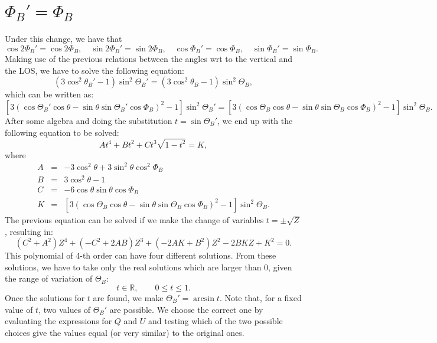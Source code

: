 \documentclass[12pt]{article}
\begin{document}
\section{$\Phi_B' = \Phi_B$}
Under this change, we have that
\begin{equation}
\cos 2\Phi_B' = \cos 2\Phi_B, \quad \sin 2\Phi_B' = \sin 2\Phi_B, \quad \cos \Phi_B' = \cos \Phi_B, \quad \sin \Phi_B' = \sin \Phi_B.
\end{equation}
Making use of the previous relations between the angles wrt to the vertical and the LOS, we have to solve the 
following equation:
\begin{equation}
\left( 3 \cos^2\theta_B'-1 \right) \sin^2 \Theta_B' = \left( 3 \cos^2\theta_B-1 \right) \sin^2 \Theta_B,
\end{equation}
which can be written as:
\begin{equation}
\left[ 3 \left( \cos \Theta_B' \cos \theta - \sin\theta \sin\Theta_B' \cos\Phi_B\right)^2-1 \right] \sin^2 \Theta_B' = 
\left[ 3 \left( \cos \Theta_B \cos \theta - \sin\theta \sin\Theta_B \cos\Phi_B\right)^2-1 \right] \sin^2 \Theta_B.
\end{equation}
After some algebra and doing the substitution $t=\sin\Theta_B'$, we end up with the following equation to be
solved:
\begin{equation}
A t^4 + Bt^2 + C t^3 \sqrt{1-t^2} = K,
\end{equation}
where
\begin{eqnarray}
A &=& -3\cos^2 \theta + 3\sin^2 \theta \cos^2 \Phi_B \nonumber \\
B &=& 3\cos^2 \theta - 1 \nonumber \\
C &=& -6 \cos\theta \sin\theta \cos \Phi_B \nonumber \\
K &=& \left[ 3 \left( \cos \Theta_B \cos \theta - \sin\theta \sin\Theta_B \cos\Phi_B\right)^2-1 \right] \sin^2 \Theta_B.
\end{eqnarray}
The previous equation can be solved if we make the change of variables $t=\pm \sqrt{Z}$, resulting in:
\begin{equation}
(C^2+A^2) Z^4 + (-C^2+2AB) Z^3 + (-2AK+B^2) Z^2 - 2BKZ + K^2 = 0.
\end{equation}
This polynomial of 4-th order can have four different solutions. From these solutions, we have to take only
the real solutions which are larger than 0, given the range of variation of $\Theta_B$:
\begin{equation}
t \in \mathbb{R}, \qquad 0 \leq t \leq 1.
\end{equation}
Once the solutions for $t$ are found, we make $\Theta_B' = \arcsin t$. Note that, for a fixed value of $t$,
two values of $\Theta_B'$ are possible. We choose the correct one by evaluating the expressions for 
$Q$ and $U$ and testing which of the two possible choices give the values equal (or very similar) to the original ones.
\end{document}
